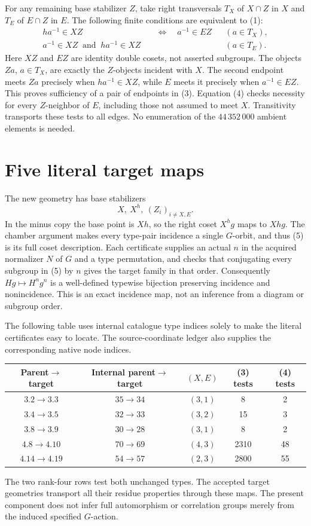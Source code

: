 \documentclass[11pt]{article}
\begin{document}
For any remaining base stabilizer $Z$, take right transversals
$T_X$ of $X\cap Z$ in $X$ and $T_E$ of $E\cap Z$ in $E$.
The following finite conditions are equivalent to (1):
\begin{align}
 h a^{-1}\in XZ&\quad\Longleftrightarrow\quad a^{-1}\in EZ
                                      &&(a\in T_X),\tag{3}\\
 a^{-1}\in XZ\ \text{ and }\ h a^{-1}\in XZ
                                      &&&(a\in T_E).\tag{4}
\end{align}
Here $XZ$ and $EZ$ are identity double cosets, not asserted subgroups.
The objects $Za$, $a\in T_X$, are exactly the $Z$-objects incident
with $X$. The second endpoint meets $Za$ precisely when
$ha^{-1}\in XZ$, while $E$ meets it precisely when $a^{-1}\in EZ$.
This proves sufficiency of a pair of endpoints in (3). Equation (4)
checks necessity for every $Z$-neighbor of $E$, including those not
assumed to meet $X$. Transitivity transports these tests to all edges.
No enumeration of the $44\,352\,000$ ambient elements is needed.

\section{Five literal target maps}
The new geometry has base stabilizers
\[
                     X,\ X^h,\ (Z_i)_{i\ne X,E}.        \tag{5}
\]
In the minus copy the base point is $Xh$, so the right coset $X^h g$
maps to $Xhg$. The chamber argument makes every type-pair incidence a
single $G$-orbit, and thus (5) is its full coset description.
Each certificate supplies an actual $n$ in the acquired normalizer
$N$ of $G$ and a type permutation, and checks that conjugating every
subgroup in (5) by $n$ gives the target family in that order.
Consequently $Hg\mapsto H^n g^n$ is a well-defined typewise bijection
preserving incidence and nonincidence. This is an exact incidence map,
not an inference from a diagram or subgroup order.

The following table uses internal catalogue type indices solely to make
the literal certificates easy to locate. The source-coordinate ledger
also supplies the corresponding native node indices.
\begin{center}\small
\begin{tabular}{ccccc}\toprule
Parent$\to$target & Internal parent$\to$target & $(X,E)$ & (3) tests & (4) tests\\\midrule
$3.2\to3.3$ & $35\to34$ & $(3,1)$ &8&2\\
$3.4\to3.5$ & $32\to33$ & $(3,2)$ &15&3\\
$3.8\to3.9$ & $30\to28$ & $(3,1)$ &8&2\\
$4.8\to4.10$ & $70\to69$ & $(4,3)$ &2310&48\\
$4.14\to4.19$ & $54\to57$ & $(2,3)$ &2800&55\\\bottomrule
\end{tabular}
\end{center}
The two rank-four rows test both unchanged types. The accepted target
geometries transport all their residue properties through these maps.
The present component does not infer full automorphism or correlation
groups merely from the induced specified $G$-action.
\end{document}
